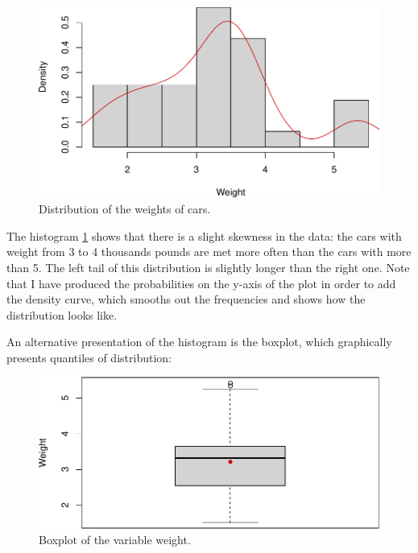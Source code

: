 \documentclass[
]{book}
\newenvironment{Shaded}{\begin{snugshade}}{\end{snugshade}}
\newcommand{\DataTypeTok}[1]{\textcolor[rgb]{0.13,0.29,0.53}{#1}}
\newcommand{\DecValTok}[1]{\textcolor[rgb]{0.00,0.00,0.81}{#1}}
\newcommand{\KeywordTok}[1]{\textcolor[rgb]{0.13,0.29,0.53}{\textbf{#1}}}
\newcommand{\NormalTok}[1]{#1}
\newcommand{\OperatorTok}[1]{\textcolor[rgb]{0.81,0.36,0.00}{\textbf{#1}}}
\newcommand{\StringTok}[1]{\textcolor[rgb]{0.31,0.60,0.02}{#1}}
\theoremstyle{definition}
\theoremstyle{definition}
\theoremstyle{definition}
\theoremstyle{definition}
\theoremstyle{remark}
\begin{document}
\begin{figure}
\centering
\includegraphics{Svetunkov---Statistics-for-Business-Analytics_files/figure-latex/histWeight-1.pdf}
\caption{\label{fig:histWeight}Distribution of the weights of cars.}
\end{figure}

The histogram \ref{fig:histWeight} shows that there is a slight skewness in the data: the cars with weight from 3 to 4 thousands pounds are met more often than the cars with more than 5. The left tail of this distribution is slightly longer than the right one. Note that I have produced the probabilities on the y-axis of the plot in order to add the density curve, which smooths out the frequencies and shows how the distribution looks like.

An alternative presentation of the histogram is the boxplot, which graphically presents quantiles of distribution:

\begin{Shaded}
\end{Shaded}

\begin{figure}
\centering
\includegraphics{Svetunkov---Statistics-for-Business-Analytics_files/figure-latex/boxWeight-1.pdf}
\caption{\label{fig:boxWeight}Boxplot of the variable weight.}
\end{figure}
\end{document}
